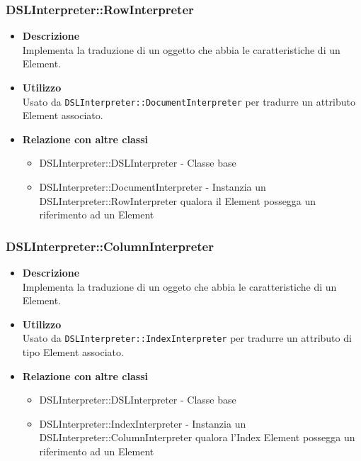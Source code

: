 \subsubsection{DSLInterpreter::RowInterpreter}
\begin{itemize}
\item \textbf{Descrizione} \hfill \\
Implementa la traduzione di un oggetto che abbia le caratteristiche di un  Element.
\item \textbf{Utilizzo} \hfill \\
Usato da \texttt{DSLInterpreter::DocumentInterpreter} per tradurre un attributo  Element associato.
\item \textbf{Relazione con altre classi}  
\begin{itemize}
\item DSLInterpreter::DSLInterpreter - Classe base
\item DSLInterpreter::DocumentInterpreter - Instanzia un DSLInterpreter::RowInterpreter qualora il  Element possegga un riferimento ad un  Element
\end{itemize}
\end{itemize}

\subsubsection{DSLInterpreter::ColumnInterpreter}
\begin{itemize}
\item \textbf{Descrizione} \hfill \\
Implementa la traduzione di un oggeto che abbia le caratteristiche di un  Element.
\item \textbf{Utilizzo} \hfill \\
Usato da \texttt{DSLInterpreter::IndexInterpreter} per tradurre un attributo di tipo  Element associato.
\item \textbf{Relazione con altre classi}
\begin{itemize}
\item DSLInterpreter::DSLInterpreter - Classe base
\item DSLInterpreter::IndexInterpreter - Instanzia un DSLInterpreter::ColumnInterpreter qualora l'Index Element possegga un riferimento ad un  Element
\end{itemize}
\end{itemize}

